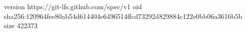 version https://git-lfs.github.com/spec/v1
oid sha256:120964fee80ab54d614404e6496514ffcd73292d829884c122e0bb06a3616b5b
size 422373
